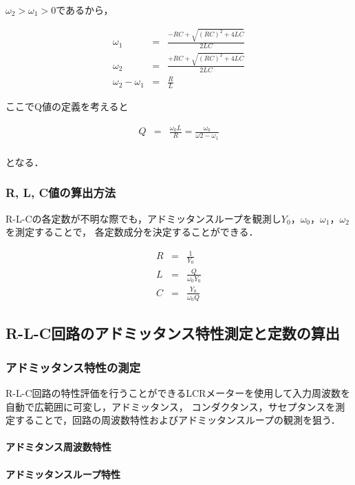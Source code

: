 \documentclass[dvipdfmx,titlepage,a4j]{jsarticle}  %
\begin{document}
$\omega_2 > \omega_1 > 0$であるから，

\begin{eqnarray}
  \omega_1 &=& \frac{-RC + \sqrt{(RC)^2 + 4LC}}{2LC} \\
  \omega_2 &=& \frac{+RC + \sqrt{(RC)^2 + 4LC}}{2LC} \\
  \omega_2 - \omega_1 &=& \frac{R}{L}
\end{eqnarray}

ここでQ値の定義を考えると

\begin{eqnarray}
  Q &=& \frac{\omega_0 L}{R} = \frac{\omega_0}{\omega2 - \omega_1}\\
\end{eqnarray}

となる．

\subsubsection{R, L, C値の算出方法}
R-L-Cの各定数が不明な際でも，アドミッタンスループを観測し$Y_0$，$\omega_0$，$\omega_1$，$\omega_2$を測定することで，
各定数成分を決定することができる．

\begin{eqnarray}
  R &=& \frac{1}{Y_0} \\
  L &=& \frac{Q}{\omega_0 Y_0} \\
  C &=& \frac{Y_0}{\omega_0 Q}
\end{eqnarray}

\subsection{R-L-C回路のアドミッタンス特性測定と定数の算出}

\subsubsection{アドミッタンス特性の測定}
R-L-C回路の特性評価を行うことができるLCRメーターを使用して入力周波数を自動で広範囲に可変し，アドミッタンス，
コンダクタンス，サセプタンスを測定することで，回路の周波数特性およびアドミッタンスループの観測を狙う．

\paragraph{アドミタンス周波数特性}

\paragraph{アドミッタンスループ特性}
\end{document}
